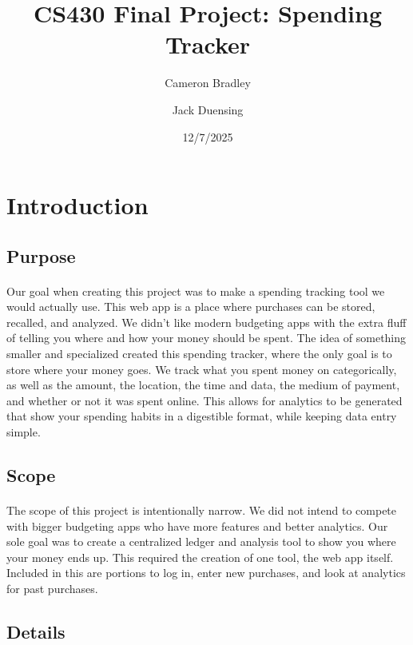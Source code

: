\documentclass{article}
\title{CS430 Final Project: Spending Tracker}
\date{12/7/2025}
\author{Cameron Bradley \and Jack Duensing}
\begin{document}
	
	\maketitle
	
	\section*{Introduction}
	
		\subsection*{Purpose}
	
			\paragraph{} Our goal when creating this project was to make a spending tracking tool we would actually use. This web app is a place where purchases can be stored, recalled, and analyzed. We didn't like modern budgeting apps with the extra fluff of telling you where and how your money should be spent. The idea of something smaller and specialized created this spending tracker, where the only goal is to store where your money goes. We track what you spent money on categorically, as well as the amount, the location, the time and data, the medium of payment, and whether or not it was spent online. This allows for analytics to be generated that show your spending habits in a digestible format, while keeping data entry simple.
	
		\subsection*{Scope}
		
			\paragraph{} The scope of this project is intentionally narrow. We did not intend to compete with bigger budgeting apps who have more features and better analytics. Our sole goal was to create a centralized ledger and analysis tool to show you where your money ends up. This required the creation of one tool, the web app itself. Included in this are portions to log in, enter new purchases, and look at analytics for past purchases.
		
		\subsection*{Details}
		
\end{document}

